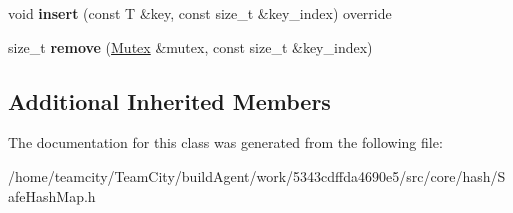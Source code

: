 \begin{DoxyCompactItemize}
\item 
void {\bfseries insert} (const T \&key, const size\+\_\+t \&key\+\_\+index) override\hypertarget{classSafeHashMap_a04620cef04074339b86368bfffef9151}{}\label{classSafeHashMap_a04620cef04074339b86368bfffef9151}

\item 
size\+\_\+t {\bfseries remove} (\hyperlink{classMutex}{Mutex} \&mutex, const size\+\_\+t \&key\+\_\+index)\hypertarget{classSafeHashMap_af37c6507b466dd6e36af3d0a9f556be7}{}\label{classSafeHashMap_af37c6507b466dd6e36af3d0a9f556be7}

\end{DoxyCompactItemize}
\subsection*{Additional Inherited Members}


The documentation for this class was generated from the following file\+:\begin{DoxyCompactItemize}
\item 
/home/teamcity/\+Team\+City/build\+Agent/work/5343cdffda4690e5/src/core/hash/Safe\+Hash\+Map.\+h\end{DoxyCompactItemize}
